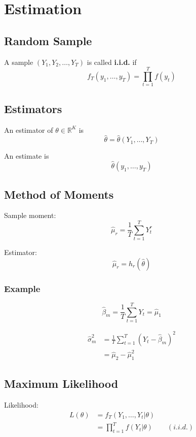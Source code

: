 \chapter{Estimation}

\section{Random Sample}

A sample $(Y_1, Y_2, \dots, Y_T)$ is called \textbf{i.i.d.} if
\[
f_T(y_1,\dots,y_T) = \prod_{t=1}^T f(y_t)
\]

\section{Estimators}

An estimator of $\theta \in \mathbb{R}^K$ is
\[
\hat{\theta} = \hat{\theta}(Y_1,\dots,Y_T)
\]

An estimate is
\[
\hat{\theta}(y_1,\dots,y_T)
\]

\section{Method of Moments}

Sample moment:
\[
\hat{\mu}_r = \frac{1}{T} \sum_{t=1}^T Y_t^r
\]

Estimator:
\[
\hat{\mu}_r = h_r(\hat \theta)
\]

\subsection{Example}

\[
\hat{\beta}_m = \frac{1}{T} \sum_{t=1}^T Y_t = \hat{\mu}_1
\]

\[
\begin{aligned}
\hat{\sigma}_m^2 
&= \frac{1}{T} \sum_{t=1}^T (Y_t - \hat{\beta}_m)^2 \\
&= \hat{\mu}_2 - \hat{\mu}_1^2
\end{aligned}
\]

\section{Maximum Likelihood}

Likelihood:
\[
\begin{aligned}
L(\theta) 
&= f_T(Y_1, \dots ,Y_t|\theta)\\
&= \prod_{t=1}^T f(Y_t|\theta) \qquad (i.i.d.)
\end{aligned}
\]

